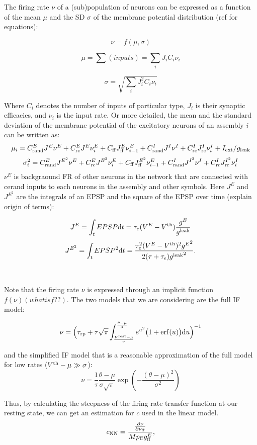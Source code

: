 The firing rate $\nu$ of a (sub)population of neurons can be expressed as a function of the mean $\mu$ and the SD $\sigma$ of the membrane potential distribution (ref for equations):

\[ \nu = f(\mu , \sigma) \]

\[
\mu = \sum(inputs) = \sum_{i}J_i C_i \nu_i
\]

\[
\sigma = \sqrt{\sum_{i}J^2_i C_i \nu_i}
\]

Where $C_i$ denotes the number of inputs of particular type, $J_i$ is their synaptic efficacies, and $\nu_i$ is the input rate.
Or more detailed, the mean and the standard deviation of the membrane potential of the excitatory neurons of an assembly $i$ can be written as:
\[
  \mu_i = C_{\rm rand}^E J^E \nu^E + C_{\rm rc}^E J^E \nu_i^E + C_{\rm ff} J_{\rm ff}^E \nu^E_{i-1} + C_{\rm rand}^I J^{I} \nu^I + C_{\rm rc}^I J^{I}_{\rm rc} \nu_{i}^I + I_{\rm ext}/g_{\rm leak}
\]
\[
  \sigma_i^2 = C_{\rm rand}^E J^{E^2} \nu^E + C_{\rm rc}^E J^{E^2} \nu_i^E + C_{\rm ff} J_{\rm ff}^{E^2} \nu^E_{i-1} + C_{\rm rand}^I J^{I^2} \nu^I + C_{\rm rc}^I J^{I^2}_{\rm rc} \nu_{i}^I 
\]
$\nu^E$ is backgraound FR of other neurons in the network that are connected with cerand inputs to each neurons in the assembly and other symbols.
Here $J^E$ and $J^{E^2}$ are the integrals of an EPSP and the square of the EPSP over time (explain origin of terms):

\[
  J^E = \int_t{EPSP}{\rm d} t = \tau_e (V^E - V^{\rm th}) \frac{g^E}{g^{\rm leak}}
\]
\[
  J^{E^2} = \int_t{EPSP^2}{\rm d}t = \frac{\tau_e^2 (V^E - V^{\rm th})^2 {g^E}^2}{2(\tau + \tau_e) {g^{\rm leak}}^2} .
\]\\\\

Note that the firing rate $\nu$ is expressed through an implicit function $f(\nu) (what is f??)$.
The two models that we are considering are the full IF model:

\[
  \nu = \Big(\tau_{\rm rp} + \tau \sqrt{\pi} \int_{\frac{V^{\rm rest}-\mu}{\sigma}}^{\frac{\theta-\mu}{\sigma}} e^{u^2} \big( 1+ {\rm erf}(u) \big) {\rm d}u \Big)^{-1}
\]

and the simplified IF model that is a reasonable approximation of the full model for low rates ($ V^{\rm th} - \mu \gg \sigma $):
\[ 
  \nu = \frac{1}{\tau} \frac{\theta - \mu}{\sigma \sqrt{\pi}} \exp \left(- {\frac{(\theta - \mu)^2}{\sigma^2}} \right)
\]

Thus, by calculating the steepness of the firing rate transfer function at our resting state, we can get an estimation for $c$ used in the linear model.
\[
  c_{\rm NN} = \frac{\frac{\partial \nu}{\partial \nu_{\rm ff}}}{Mp_{\rm ff}g_{\rm ff}^E } ,
\]

